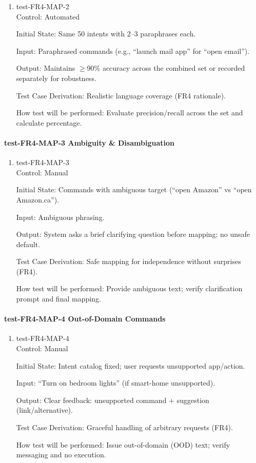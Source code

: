 \documentclass[12pt, titlepage]{article}
\begin{document}
\begin{enumerate}
\item{test-FR4-MAP-2\\}
Control: Automated

Initial State: Same 50 intents with 2–3 paraphrases each.

Input: Paraphrased commands (e.g., “launch mail app” for “open email”).

Output: Maintains $\geq$90\% accuracy across the combined set or recorded separately for robustness.

Test Case Derivation: Realistic language coverage (FR4 rationale).

How test will be performed: Evaluate precision/recall across the set and calculate percentage.
\end{enumerate}

\paragraph{test-FR4-MAP-3 Ambiguity \& Disambiguation}

\begin{enumerate}
\item{test-FR4-MAP-3\\}
Control: Manual

Initial State: Commands with ambiguous target (“open Amazon” vs “open Amazon.ca”).

Input: Ambiguous phrasing.

Output: System asks a brief clarifying question before mapping; no unsafe default.

Test Case Derivation: Safe mapping for independence without surprises (FR4).

How test will be performed: Provide ambiguous text; verify clarification prompt and final mapping.
\end{enumerate}

\paragraph{test-FR4-MAP-4 Out-of-Domain Commands}

\begin{enumerate}
\item{test-FR4-MAP-4\\}
Control: Manual

Initial State: Intent catalog fixed; user requests unsupported app/action.

Input: “Turn on bedroom lights” (if smart-home unsupported).

Output: Clear feedback: unsupported command + suggestion (link/alternative).

Test Case Derivation: Graceful handling of arbitrary requests (FR4).

How test will be performed: Issue out-of-domain (OOD) text; verify messaging and no execution.
\end{enumerate}
\end{document}
